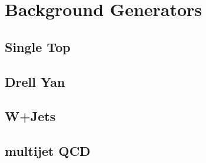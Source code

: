 \section{Background Generators}
\label{sec:ttMC}

\subsection{Single Top}
\label{ssec:bkgST}
\subsection{Drell Yan}
\label{ssec:bkgDY}
\subsection{W+Jets}
\label{ssec:bkgW}
\subsection{multijet QCD}
\label{ssec:bkgQCD}
